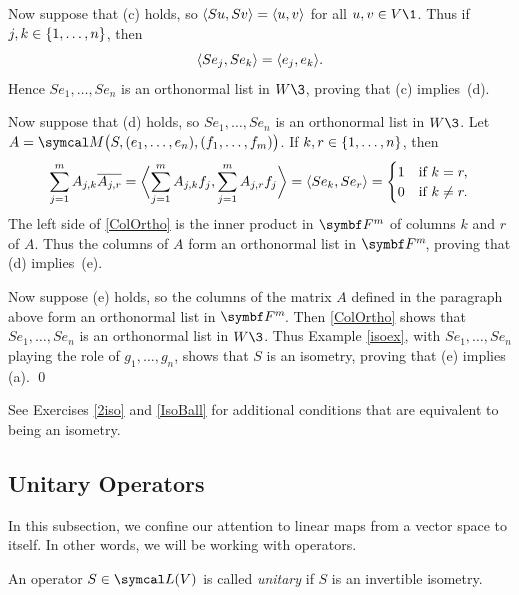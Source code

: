Now suppose that (c) holds, so $\ip{Su, Sv} = \ip{u, v}$ for all $u, v \in V\1$. Thus if ${j, k} \in \br{1, \ldots, n}$, then
\[
\ip{Se_j, Se_k} = \ip{e_j, e_k}.
\]
Hence $Se_1, \dots, Se_n$ is an orthonormal list in $W\3$, proving that (c) implies~(d).

Now suppose that (d) holds, so $Se_1, \dots, Se_n$ is an orthonormal list in $W\3$. Let
$A = \M\paren[\big]{S, (e_1, \ldots, e_n), (f_1, \ldots, f_m)}$. If $k, r \in \br{1, \dots, n}$, then
\begin{equation}
\sum_{j=1}^m A_{j,k} \overline{ A_{j,r} } = \ip[\bigg]{ \sum_{j=1}^m A_{j,k} f_j, \sum_{j=1}^m A_{j,r} f_j }
= \ip{Se_k, Se_r} = \begin{cases}
1 & \text{if } k = r,\\
0 & \text{if } k \ne r.
\end{cases} \label{ColOrtho}
\end{equation}%
The left side of \ref{ColOrtho}  is the inner product in $\F m$ of columns $k$ and $r$ of $A$.
Thus the columns of $A$ form an orthonormal list in $\FF{m}$, proving that (d) implies~(e).

Now suppose (e) holds, so the columns of the matrix $A$ defined in the paragraph above form an orthonormal list in $\FF{m}$. Then \ref{ColOrtho} shows that $Se_1, \dots, Se_n$ is an orthonormal list in $W\3$. Thus Example \ref{isoex}, with
$Se_1, \dots, Se_n$ playing the role of $g_1, \ldots, g_n$, shows that $S$ is an isometry, proving that (e) implies (a).
\qed

See Exercises \ref{2iso} and \ref{IsoBall} for additional conditions that are equivalent to being an isometry.

\pagebreak[3]

\subsection{Unitary Operators}

In this subsection, we confine our attention to linear maps from a vector space to itself. In other words, we will be working with operators.

{An operator $S \in \L(V)$ is called \emph{unitary} if $S$ is an invertible isometry.}



